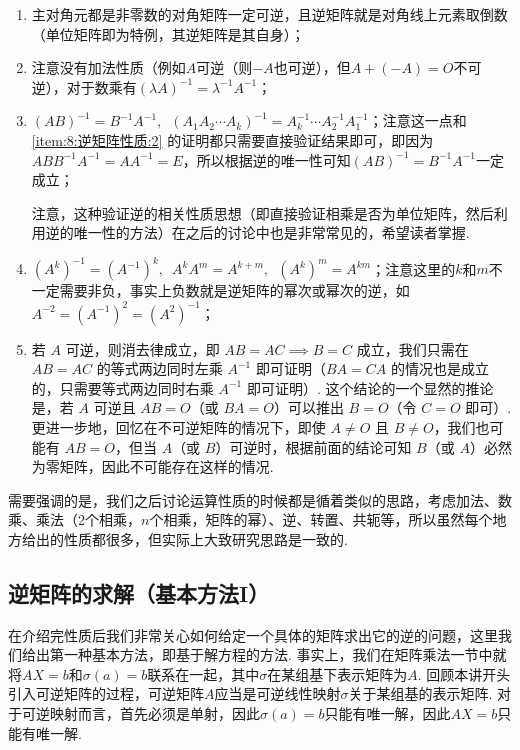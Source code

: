 \begin{enumerate}[label=(\arabic*)]
    \item 主对角元都是非零数的对角矩阵一定可逆，且逆矩阵就是对角线上元素取倒数（单位矩阵即为特例，其逆矩阵是其自身）；

    \item \label{item:8:逆矩阵性质:2}
          注意没有加法性质（例如$A$可逆（则$-A$也可逆），但$A+(-A)=O$不可逆），对于数乘有$(\lambda A)^{-1}=\lambda^{-1}A^{-1}$；

    \item \label{item:8:逆矩阵性质:3}
          $(AB)^{-1}=B^{-1}A^{-1},\enspace (A_1A_2\cdots A_k)^{-1}=A_k^{-1}\cdots A_2^{-1}A_1^{-1}$；注意这一点和 \ref*{item:8:逆矩阵性质:2} 的证明都只需要直接验证结果即可，即因为$ABB^{-1}A^{-1}=AA^{-1}=E$，所以根据逆的唯一性可知$(AB)^{-1}=B^{-1}A^{-1}$一定成立；

          注意，这种验证逆的相关性质思想（即直接验证相乘是否为单位矩阵，然后利用逆的唯一性的方法）在之后的讨论中也是非常常见的，希望读者掌握.

    \item $(A^k)^{-1}=(A^{-1})^k,\enspace A^kA^m=A^{k+m},\enspace (A^k)^m=A^{km}$；注意这里的$k$和$m$不一定需要非负，事实上负数就是逆矩阵的幂次或幂次的逆，如$A^{-2}=(A^{-1})^2=(A^2)^{-1}$；

    \item 若 $A$ 可逆，则消去律成立，即 $AB=AC \implies B=C$ 成立，我们只需在 $AB=AC$ 的等式两边同时左乘 $A^{-1}$ 即可证明（$BA = CA$ 的情况也是成立的，只需要等式两边同时右乘 $A^{-1}$ 即可证明）. 这个结论的一个显然的推论是，若 $A$ 可逆且 $AB=O$（或 $BA = O$）可以推出 $B=O$（令 $C = O$ 即可）. 更进一步地，回忆在不可逆矩阵的情况下，即使 $A\neq O$ 且 $B\neq O$，我们也可能有 $AB = O$，但当 $A$（或 $B$）可逆时，根据前面的结论可知 $B$（或 $A$）必然为零矩阵，因此不可能存在这样的情况.
\end{enumerate}

需要强调的是，我们之后讨论运算性质的时候都是循着类似的思路，考虑加法、数乘、乘法（2个相乘，$n$个相乘，矩阵的幂）、逆、转置、共轭等，所以虽然每个地方给出的性质都很多，但实际上大致研究思路是一致的.

\subsection{逆矩阵的求解（基本方法I）}

在介绍完性质后我们非常关心如何给定一个具体的矩阵求出它的逆的问题，这里我们给出第一种基本方法，即基于解方程的方法. 事实上，我们在矩阵乘法一节中就将$AX=b$和$\sigma(a)=b$联系在一起，其中$\sigma$在某组基下表示矩阵为$A$. 回顾本讲开头引入可逆矩阵的过程，可逆矩阵$A$应当是可逆线性映射$\sigma$关于某组基的表示矩阵. 对于可逆映射而言，首先必须是单射，因此$\sigma(a)=b$只能有唯一解，因此$AX=b$只能有唯一解.

